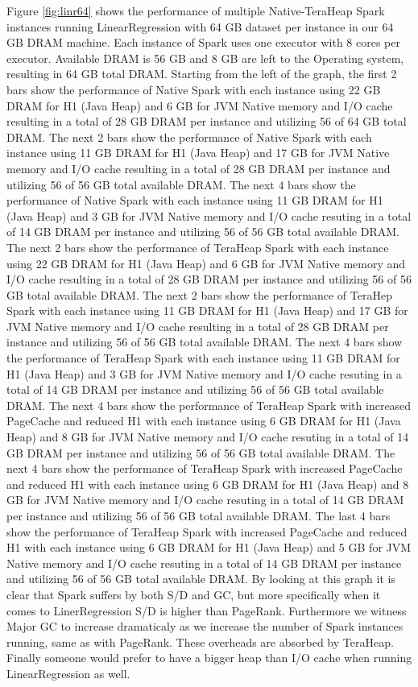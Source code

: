 \documentclass[twocolumn,10pt]{asme2e}
\begin{document}
Figure \ref{fig:linr64} shows the performance of multiple Native-TeraHeap Spark instances running LinearRegression with 64 GB dataset per instance in our 64 GB DRAM machine. Each instance of Spark uses one executor with 8 cores per executor. Available DRAM is 56 GB and 8 GB are left to the Operating system, resulting in 64 GB total DRAM. Starting from the left of the graph, the first 2 bars show the performance of Native Spark with each instance using 22 GB DRAM for H1 (Java Heap) and 6 GB for JVM Native memory and I/O cache resulting in a total of 28 GB DRAM per instance and utilizing 56 of 64 GB total DRAM. The next 2 bars show the performance of Native Spark with each instance using 11 GB DRAM for H1 (Java Heap) and 17 GB for JVM Native memory and I/O cache resulting in a total of 28 GB DRAM per instance and utilizing 56 of 56 GB total available DRAM. The next 4 bars show the performance of Native Spark with each instance using 11 GB DRAM for H1 (Java Heap) and 3 GB for JVM Native memory and I/O cache resuting in a total of 14 GB DRAM per instance and utilizing 56 of 56 GB total available DRAM. 
The next 2 bars show the performance of TeraHeap Spark with each instance using 22 GB DRAM for H1 (Java Heap) and 6 GB for JVM Native memory and I/O cache resulting in a total of 28 GB DRAM per instance and utilizing 56 of 56 GB total available DRAM. The next 2 bars show the performance of TeraHep Spark with each instance using 11 GB DRAM for H1 (Java Heap) and 17 GB for JVM Native memory and I/O cache resulting in a total of 28 GB DRAM per instance and utilizing 56 of 56 GB total available DRAM. The next 4 bars show the performance of TeraHeap Spark with each instance using 11 GB DRAM for H1 (Java Heap) and 3 GB for JVM Native memory and I/O cache resuting in a total of 14 GB DRAM per instance and utilizing 56 of 56 GB total available DRAM. The next 4 bars show the performance of TeraHeap Spark with increased PageCache and reduced H1 with each instance using 6 GB DRAM for H1 (Java Heap) and 8 GB for JVM Native memory and I/O cache resuting in a total of 14 GB DRAM per instance and utilizing 56 of 56 GB total available DRAM. The next 4 bars show the performance of TeraHeap Spark with increased PageCache and reduced H1 with each instance using 6 GB DRAM for H1 (Java Heap) and 8 GB for JVM Native memory and I/O cache resuting in a total of 14 GB DRAM per instance and utilizing 56 of 56 GB total available DRAM. The last 4 bars show the performance of TeraHeap Spark with increased PageCache and reduced H1 with each instance using 6 GB DRAM for H1 (Java Heap) and 5 GB for JVM Native memory and I/O cache resuting in a total of 14 GB DRAM per instance and utilizing 56 of 56 GB total available DRAM.
By looking at this graph it is clear that Spark suffers by both S/D and GC, but more specifically when it comes to LinerRegression S/D is higher than PageRank. Furthermore we witness Major GC to increase dramaticaly as we increase the number of Spark instances running, same as with PageRank. These overheads are absorbed by TeraHeap. Finally someone would prefer to have a bigger heap than I/O cache when running LinearRegression as well.
\end{document}
